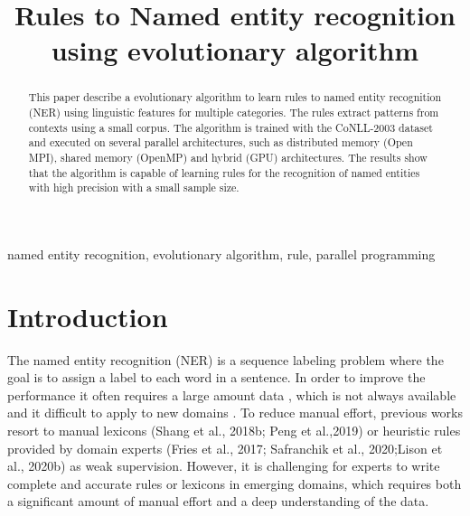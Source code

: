 \documentclass{IEEEtran}
\begin{document}
%
\title{Rules to Named entity recognition using evolutionary algorithm}

\author{
}


\maketitle

\begin{abstract}

  This paper describe a evolutionary algorithm to learn rules to named entity recognition (NER) using linguistic features for multiple categories. The rules extract patterns from contexts using a small corpus. The algorithm is trained with the CoNLL-2003 dataset and executed on several parallel architectures, such as distributed memory (Open MPI), shared memory (OpenMP) and hybrid (GPU) architectures. The results show that the algorithm is capable of learning rules for the recognition of named entities with high precision with a small sample size.

\end{abstract}


\begin{keywords}
  named entity recognition, evolutionary algorithm, rule, parallel programming

\end{keywords}


\section{Introduction}


The named entity recognition (NER) is a sequence labeling problem where the goal is to assign a label to each word in a sentence. In order to improve the performance it often requires a large amount data \cite{ma-etal-2022-label}, which is not always available and it difficult to apply to new domains \cite{Huang2020FewShotNE}. To reduce manual effort, previous works resort to manual lexicons (Shang et al., 2018b; Peng et al.,2019) or heuristic rules provided by domain experts (Fries et al., 2017; Safranchik et al., 2020;Lison et al., 2020b) as weak supervision. However, it is challenging for experts to write complete and accurate rules or lexicons in emerging domains, which requires both a significant amount of manual effort and a deep understanding of the data.
\end{document}

